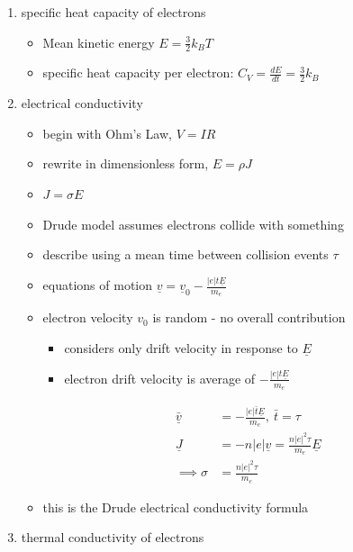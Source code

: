 \documentclass[a4paper,11pt,normalem]{article}
\begin{document}
\begin{enumerate}
    \item specific heat capacity of electrons
        \begin{itemize}
            \item Mean kinetic energy \(E = \frac{3}{2}k_BT\)
            \item specific heat capacity per electron: \(C_V = \frac{dE}{dt} = \frac{3}{2}k_B\)
        \end{itemize}
    \item electrical conductivity
        \begin{itemize}
            \item begin with Ohm's Law, \(V = IR\)
            \item rewrite in dimensionless form, \(E = \rho J\)
            \item \(J = \sigma E\)
            \item Drude model assumes electrons collide with something
            \item describe using a mean time between collision events \(\tau\)
            \item equations of motion \(\underline{v} = \underline{v}_0 - \frac{|e|t\underline{E}}{m_e}\)
            \item electron velocity \(v_0\) is random - no overall contribution
                \begin{itemize}
                    \item considers only drift velocity in response to \(\underline{E}\)
                    \item electron drift velocity is average of \(-\frac{|e|t\underline{E}}{m_e}\)
                 \end{itemize}
                \begin{align*}
                    \bar{\underline{v}} &= -\frac{|e|\bar{t}\underline{E}}{m_e},~ \bar{t} = \tau \\
                    \underline{J} &= -n|e|\underline{v} = \frac{n|e|^2\tau}{m_e}\underline{E} \\
                    \implies \sigma &= \frac{n|e|^2\tau}{m_e}
                \end{align*}
            \item this is the Drude electrical conductivity formula
        \end{itemize}
    \item thermal conductivity of electrons
        \begin{itemize}

\end{itemize}
\end{enumerate}
\end{document}
